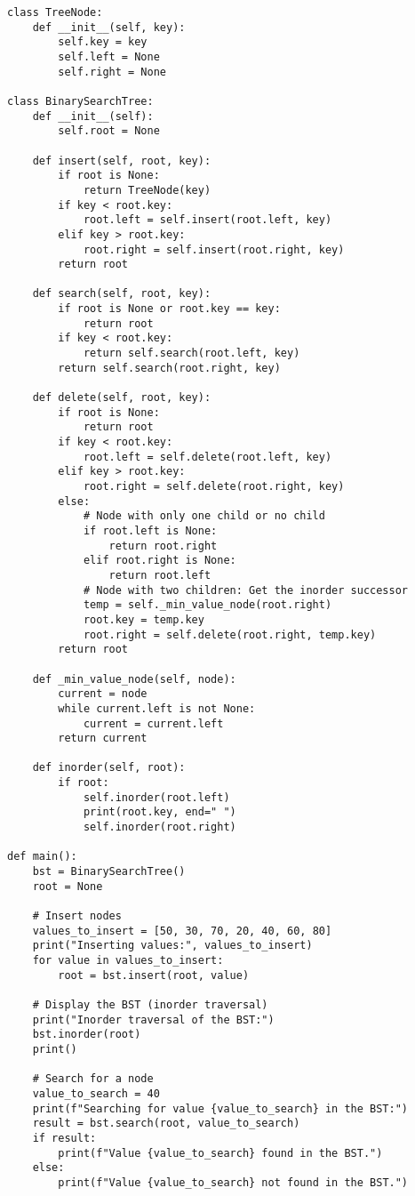 \documentclass[a4paper,12pt]{article}
\begin{document}
\begin{lstlisting}[style=pythonstyle, caption={Binary Search Tree Operations}]
class TreeNode:
    def __init__(self, key):
        self.key = key
        self.left = None
        self.right = None

class BinarySearchTree:
    def __init__(self):
        self.root = None

    def insert(self, root, key):
        if root is None:
            return TreeNode(key)
        if key < root.key:
            root.left = self.insert(root.left, key)
        elif key > root.key:
            root.right = self.insert(root.right, key)
        return root

    def search(self, root, key):
        if root is None or root.key == key:
            return root
        if key < root.key:
            return self.search(root.left, key)
        return self.search(root.right, key)

    def delete(self, root, key):
        if root is None:
            return root
        if key < root.key:
            root.left = self.delete(root.left, key)
        elif key > root.key:
            root.right = self.delete(root.right, key)
        else:
            # Node with only one child or no child
            if root.left is None:
                return root.right
            elif root.right is None:
                return root.left
            # Node with two children: Get the inorder successor
            temp = self._min_value_node(root.right)
            root.key = temp.key
            root.right = self.delete(root.right, temp.key)
        return root

    def _min_value_node(self, node):
        current = node
        while current.left is not None:
            current = current.left
        return current

    def inorder(self, root):
        if root:
            self.inorder(root.left)
            print(root.key, end=" ")
            self.inorder(root.right)

def main():
    bst = BinarySearchTree()
    root = None

    # Insert nodes
    values_to_insert = [50, 30, 70, 20, 40, 60, 80]
    print("Inserting values:", values_to_insert)
    for value in values_to_insert:
        root = bst.insert(root, value)

    # Display the BST (inorder traversal)
    print("Inorder traversal of the BST:")
    bst.inorder(root)
    print()

    # Search for a node
    value_to_search = 40
    print(f"Searching for value {value_to_search} in the BST:")
    result = bst.search(root, value_to_search)
    if result:
        print(f"Value {value_to_search} found in the BST.")
    else:
        print(f"Value {value_to_search} not found in the BST.")


\end{lstlisting}
\end{document}
